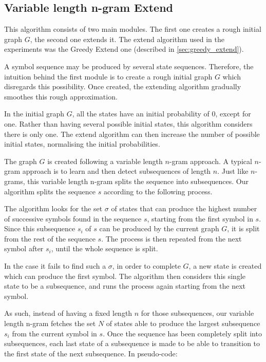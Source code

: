 \subsection{Variable length n-gram Extend}
\label{sec:vl-ngram-extend}
This algorithm consists of two main modules. The first one creates a rough initial graph $G$, the second one extends it. The extend algorithm used in the experiments was the Greedy Extend one (described in \ref{sec:greedy_extend}).

A symbol sequence may be produced by several state sequences. Therefore, the intuition behind the first module is to create a rough initial graph $G$ which disregards this possibility. Once created, the extending algorithm gradually smoothes this rough approximation.

In the initial graph $G$, all the states have an initial probability of 0, except for one. Rather than having several possible initial states, this algorithm considers there is only one. The extend algorithm can then increase the number of possible initial states, normalising the initial probabilities.

The graph $G$ is created following a variable length $n$-gram approach. A typical $n$-gram approach is to learn and then detect subsequences of length $n$. Just like $n$-grams, this variable length n-gram splits the sequence into subsequences. Our algorithm splits the sequence $s$ according to the following process.

The algorithm looks for the set $\sigma$ of states that can produce the highest number of successive symbols found in the sequence $s$, starting from the first symbol in $s$. Since this subsequence $s_i$ of $s$ can be produced by the current graph $G$, it is split from the rest of the sequence $s$. The process is then repeated from the next symbol after $s_i$, until the whole sequence is split.

In the case it fails to find such a $\sigma$, in order to complete $G$, a new state is created which can produce the first symbol. The algorithm then considers this single state to be a subsequence, and runs the process again starting from the next symbol.

As such, instead of having a fixed length $n$ for those subsequences, our variable length n-gram fetches the set $N$ of states able to produce the largest subsequence $s_i$ from the current symbol in $s$. Once the sequence has been completely split into subsequences, each last state of a subsequence is made to be able to transition to the first state of the next subsequence. In pseudo-code:

